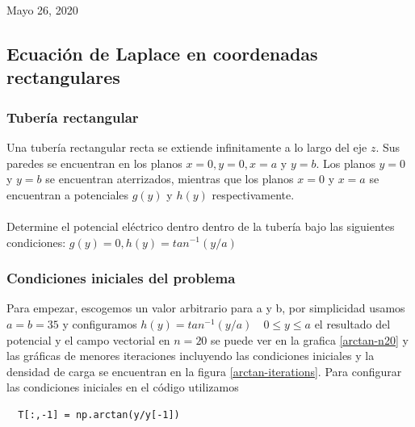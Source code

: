 \documentclass[10pt,journal,compsoc]{IEEEtran}
\begin{document}
\hfill Mayo 26, 2020

\subsection{Ecuación de Laplace en coordenadas rectangulares}

\subsubsection{Tubería rectangular}
Una tubería rectangular recta se extiende infinitamente a lo largo del eje \(z\).
Sus paredes se encuentran en los planos \(x=0,y=0,x=a\) y \(y=b\).
Los planos \(y = 0\) y \(y = b\) se encuentran aterrizados, mientras que los planos
\(x = 0\) y \(x = a\) se encuentran a potenciales \(g(y)\) y \(h(y)\) respectivamente.
\\\\
Determine el potencial eléctrico dentro dentro de la tubería bajo las siguientes condiciones:
\(g(y) = 0, h(y) = tan^{-1}(y/a)\)
\\

\subsubsection{Condiciones iniciales del problema}

Para empezar, escogemos un valor arbitrario para a y b, por simplicidad usamos \(a = b = 35 \)
y configuramos \(h(y) = tan^{-1}(y/a) \quad 0\leq y \leq a \)
el resultado del potencial y el campo vectorial en \(n = 20\) se puede ver en la grafica \ref{arctan-n20}
y las gráficas de menores iteraciones incluyendo las condiciones iniciales y la densidad de carga
se encuentran en la figura \ref{arctan-iterations}.
Para configurar las condiciones iniciales en el código utilizamos
\begin{lstlisting}
  T[:,-1] = np.arctan(y/y[-1])
\end{lstlisting}
\end{document}
